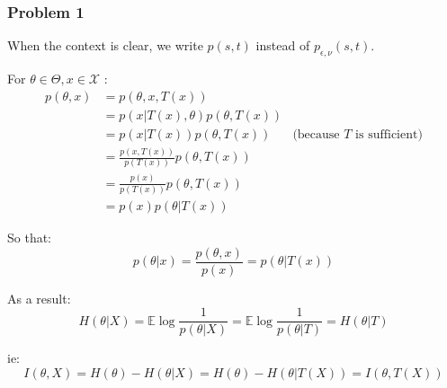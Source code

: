 \emph{}\documentclass[12pt]{article}
\newcommand{\Q}[1]{\subsubsection*{Problem #1}}
\begin{document}
\Q{1}
When the context is clear, we write $p(s,t)$ instead of $p_{\epsilon, \nu}(s,t)$.

For $\theta \in \Theta, x \in \mathcal X$ :
\begin{align*}
  p(\theta, x) &= p(\theta, x, T(x))
  \\&= p(x | T(x), \theta)p(\theta, T(x))
  \\&= p(x | T(x))p(\theta, T(x))& \text{(because $T$ is sufficient)}
  \\&= \frac{p(x, T(x))}{p(T(x))}p(\theta, T(x))
  \\&= \frac{p(x)}{p(T(x))} p(\theta, T(x))
  \\&= p(x) p(\theta | T(x))
\end{align*}

So that: 
$$p(\theta | x)  = \frac{p(\theta, x)}{p(x)} = p(\theta | T(x))$$

As a result:
$$H(\theta | X) = \mathbb E \log \frac1 {p(\theta | X)}  = \mathbb E \log \frac1 {p(\theta | T)}  = H(\theta | T)$$

ie:
$$I(\theta, X) = H(\theta) - H(\theta | X) = H(\theta) - H(\theta | T(X)) = I(\theta, T(X))$$
    
\end{document}
